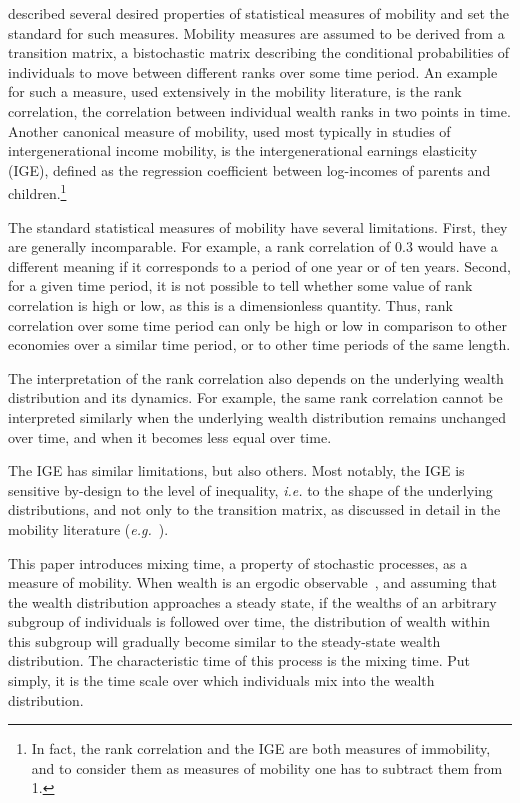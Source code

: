 \documentclass[11pt]{article}
\newcommand{\ie}{{\it i.e.}\xspace}
\newcommand{\eg}{{\it e.g.}\xspace}
\numberwithin{equation}{section}
\begin{document}
\citet{Shorrocks1978} described several desired properties of statistical measures of mobility and set the standard for such measures. Mobility measures are assumed to be derived from a transition matrix, a bistochastic matrix describing the conditional probabilities of individuals to move between different ranks over some time period. An example for such a measure, used extensively in the mobility literature, is the rank correlation, the correlation between individual wealth ranks in two points in time. Another canonical measure of mobility, used most typically in studies of intergenerational income mobility, is the intergenerational earnings elasticity (IGE), defined as the regression coefficient between log-incomes of parents and children.\footnote{In fact, the rank correlation and the IGE are both measures of immobility, and to consider them as measures of mobility one has to subtract them from 1.}

The standard statistical measures of mobility have several limitations. First, they are generally incomparable. For example, a rank correlation of 0.3 would have a different meaning if it corresponds to a period of one year or of ten years. Second, for a given time period, it is not possible to tell whether some value of rank correlation is high or low, as this is a dimensionless quantity. Thus, rank correlation over some time period can only be high or low in comparison to other economies over a similar time period, or to other time periods of the same length.

The interpretation of the rank correlation also depends on the underlying wealth distribution and its dynamics. For example, the same rank correlation cannot be interpreted similarly when the underlying wealth distribution remains unchanged over time, and when it becomes less equal over time.

The IGE has similar limitations, but also others. Most notably, the IGE is sensitive by-design to the level of inequality, \ie to the shape of the underlying distributions, and not only to the transition matrix, as discussed in detail in the mobility literature (\eg~\citet{chettyETAL2014}).

This paper introduces mixing time, a property of stochastic processes, as a measure of mobility. When wealth is an ergodic observable~\citep{PetersAdamou2018c}, and assuming that the wealth distribution approaches a steady state, if the wealths of an arbitrary subgroup of individuals is followed over time, the distribution of wealth within this subgroup will gradually become similar to the steady-state wealth distribution. The characteristic time of this process is the mixing time. Put simply, it is the time scale over which individuals mix into the wealth distribution.
\end{document}
